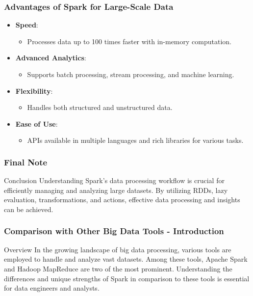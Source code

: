 \documentclass[aspectratio=169]{beamer}
\begin{document}
\begin{frame}
    \frametitle{Advantages of Spark for Large-Scale Data}
    \begin{itemize}
        \item \textbf{Speed}: 
            \begin{itemize}
                \item Processes data up to 100 times faster with in-memory computation.
            \end{itemize}
        \item \textbf{Advanced Analytics}:
            \begin{itemize}
                \item Supports batch processing, stream processing, and machine learning.
            \end{itemize}
        \item \textbf{Flexibility}:
            \begin{itemize}
                \item Handles both structured and unstructured data.
            \end{itemize}
        \item \textbf{Ease of Use}:
            \begin{itemize}
                \item APIs available in multiple languages and rich libraries for various tasks.
            \end{itemize}
    \end{itemize}
\end{frame}

\begin{frame}
    \frametitle{Final Note}
    \begin{block}{Conclusion}
        Understanding Spark's data processing workflow is crucial for efficiently managing and analyzing large datasets. By utilizing RDDs, lazy evaluation, transformations, and actions, effective data processing and insights can be achieved.
    \end{block}
\end{frame}

\begin{frame}[fragile]
    \frametitle{Comparison with Other Big Data Tools - Introduction}
    \begin{block}{Overview}
        In the growing landscape of big data processing, various tools are employed to handle and analyze vast datasets. 
        Among these tools, Apache Spark and Hadoop MapReduce are two of the most prominent. 
        Understanding the differences and unique strengths of Spark in comparison to these tools is essential for data engineers and analysts.
    \end{block}
\end{frame}
\end{document}
